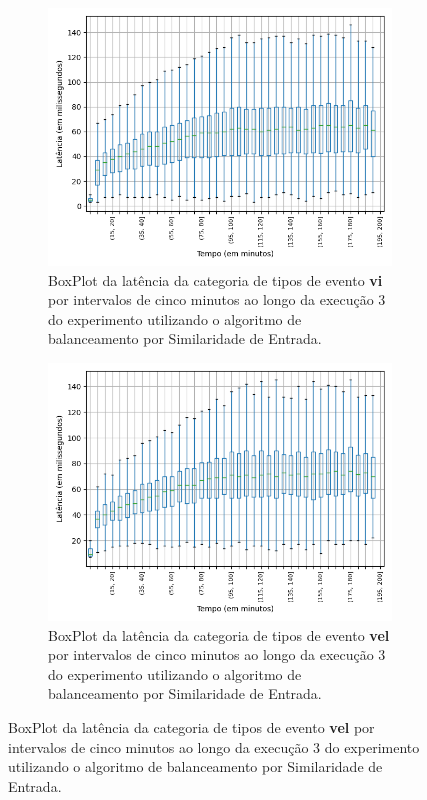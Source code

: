 \begin{figure}
\begin{subfigure}{.5\textwidth}
\centering
\includegraphics[width=\textwidth]{figuras/graphics/boxplot_8-dez-is_vi.png}
\caption{BoxPlot da latência da categoria de tipos de evento \textbf{vi} por intervalos de cinco minutos ao longo da execução 3 do experimento utilizando o algoritmo de balanceamento por Similaridade de Entrada.}
\label{fig:BoxPlot_vi_IS_8-dez-is}
\end{subfigure}%
\centering
\begin{subfigure}{.5\textwidth}
\centering
\includegraphics[width=\textwidth]{figuras/graphics/boxplot_8-dez-is_vel.png}
\caption{BoxPlot da latência da categoria de tipos de evento \textbf{vel} por intervalos de cinco minutos ao longo da execução 3 do experimento utilizando o algoritmo de balanceamento por Similaridade de Entrada.}
\label{fig:BoxPlot_vel_IS_8-dez-is}
\end{subfigure}%


\end{figure}

